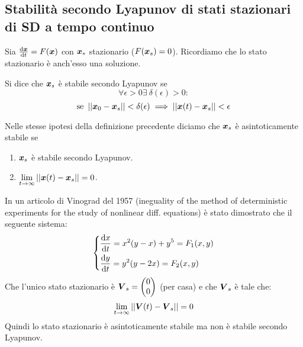 \subsection{Stabilità secondo Lyapunov di stati stazionari di SD a tempo continuo}%
\label{sub:Stabilità secondo Lyapunov di stati stazionari di SD a tempo continuo}
Sia $\frac{\text{d} \boldsymbol{x}}{\text{d} t} = F(\boldsymbol{x})$  con $\boldsymbol{x}_s$ stazionario ($F(\boldsymbol{x}_s) = 0$). Ricordiamo che lo stato stazionario è anch'esso una soluzione.
\begin{defn}
    Si dice che $\boldsymbol{x}_s$ è stabile secondo Lyapunov se
    \[
	\forall \epsilon  > 0 \exists \ \delta (\epsilon) > 0:
    \] 
    \[
	\text{se } \left|\left|\boldsymbol{x}_0-\boldsymbol{x}_s\right|\right|< \delta (\epsilon) \implies  \left|\left|\boldsymbol{x} (t)-\boldsymbol{x}_s\right|\right| < \epsilon
    \] 
\end{defn}
\noindent
\begin{defn}
    Nelle stesse ipotesi della definizione precedente diciamo che $\boldsymbol{x}_s$ è asintoticamente stabile se 
    \begin{enumerate}
        \item $\boldsymbol{x}_s$ è stabile secondo Lyapunov.
	\item $\lim\limits_{t \to \infty} \left|\left|\boldsymbol{x} (t)-\boldsymbol{x}_s\right|\right|=0$.
    \end{enumerate}
\end{defn}
\noindent
\begin{exmp}[Vinograd]
In un articolo di Vinograd del 1957 (ineguality of the method of deterministic experiments for the study of nonlinear diff. equations) è stato dimostrato che il seguente sistema:
\[\begin{dcases}
    \frac{\text{d} x}{\text{d} t} = x^2(y-x)+y^5 = F_1(x, y)\\
    \frac{\text{d} y}{\text{d} t} = y^2(y-2x)= F_2(x, y)
\end{dcases}\] 
Che l'unico stato stazionario è $\boldsymbol{V}_s = \begin{pmatrix} 0 \\ 0 \end{pmatrix}$ (per casa)  e che $\boldsymbol{V}_s$  è tale che:
\[
    \lim_{t \to \infty} \left|\left|\boldsymbol{V} (t)-\boldsymbol{V}_s\right|\right|=0
\] 
Quindi lo stato stazionario è asintoticamente stabile ma non è stabile secondo Lyapunov.
\end{exmp}
\noindent
